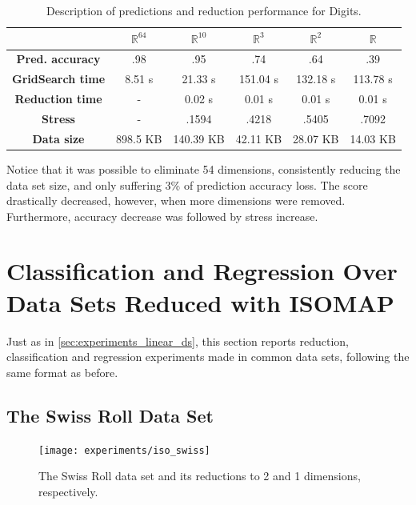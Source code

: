 \begin{table}[H]
	\centering
	\begin{tabular}{|c|c|c|c|c|c|}
		\hline
		& \textbf{$\mathbb{R}^{64}$} & \textbf{$\mathbb{R}^{10}$} & \textbf{$\mathbb{R}^3$} & \textbf{$\mathbb{R}^2$} & \textbf{$\mathbb{R}$} \\\hline
		\textbf{Pred. accuracy}   & .98 & .95 & .74 & .64 & .39 \\\hline
		\textbf{GridSearch time} & 8.51 s & 21.33 s & 151.04 s & 132.18 s & 113.78 s \\\hline
		\textbf{Reduction time} & - & 0.02 s & 0.01 s & 0.01 s & 0.01 s \\\hline
		\textbf{Stress} & - & .1594 & .4218 & .5405 & .7092 \\\hline
		\textbf{Data size} & 898.5 KB & 140.39 KB & 42.11 KB & 28.07 KB & 14.03 KB \\\hline
	\end{tabular}
	
	\caption{Description of predictions and reduction performance for Digits.}
\end{table}

Notice that it was possible to eliminate 54 dimensions, consistently reducing the data set size, and only suffering 3\% of prediction accuracy loss. The score drastically decreased, however, when more dimensions were removed. Furthermore, accuracy decrease was followed by stress increase.

\section{Classification and Regression Over Data Sets Reduced with ISOMAP}

Just as in \ref{sec:experiments_linear_ds}, this section reports reduction, classification and regression experiments made in common data sets, following the same format as before.

\subsection{The Swiss Roll Data Set}

\begin{figure}[H]
	\centering
	\texttt{[image: experiments/iso\_swiss]}
	\captionsetup{justification=centering}
	\caption{The Swiss Roll data set and its reductions to 2 and 1 dimensions, respectively.}
\end{figure}

